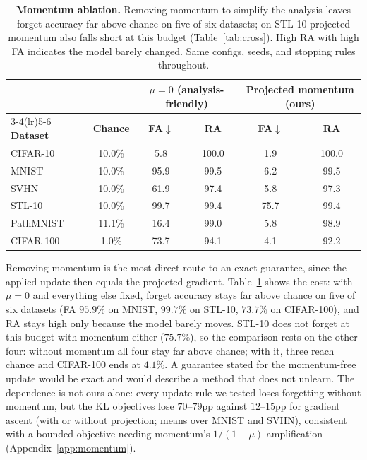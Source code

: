 \documentclass{article}
\newcommand{\rev}[1]{{\color{revisedB}#1}}
\theoremstyle{remark}
\theoremstyle{plain}
\begin{document}
\begin{table}[t]
\centering
\caption{\textbf{Momentum ablation.} Removing momentum to simplify the analysis
\rev{leaves forget accuracy far above chance on five of six datasets; on STL-10
projected momentum also falls short at this budget (Table~\ref{tab:cross})}.
High RA with high FA indicates the model barely changed. Same configs, seeds,
and stopping rules throughout.}
\label{tab:momentum}
\begin{tabular}{@{}lccccc@{}}
\toprule
& & \multicolumn{2}{c}{$\mu=0$ (analysis-friendly)} & \multicolumn{2}{c}{Projected momentum (ours)} \\
\cmidrule(lr){3-4}\cmidrule(lr){5-6}
\textbf{Dataset} & \textbf{Chance} & \textbf{FA}$\downarrow$ & \textbf{RA} & \textbf{FA}$\downarrow$ & \textbf{RA} \\
\midrule
CIFAR-10  & 10.0\% & \phantom{0}5.8 & 100.0 & \phantom{0}1.9 & 100.0 \\
MNIST     & 10.0\% & 95.9 & \phantom{0}99.5 & \phantom{0}6.2 & 99.5 \\
SVHN      & 10.0\% & 61.9 & \phantom{0}97.4 & \phantom{0}5.8 & 97.3 \\
STL-10    & 10.0\% & 99.7 & \phantom{0}99.4 & 75.7 & 99.4 \\
PathMNIST & 11.1\% & 16.4 & \phantom{0}99.0 & \phantom{0}5.8 & 98.9 \\
CIFAR-100 & \phantom{0}1.0\% & 73.7 & \phantom{0}94.1 & \phantom{0}4.1 & 92.2 \\
\bottomrule
\end{tabular}
\end{table}

Removing momentum is the most direct route to an exact guarantee, since the
applied update then equals the projected gradient. Table~\ref{tab:momentum} shows
the cost: with $\mu = 0$ and everything else fixed, \rev{forget accuracy stays
far above chance on five of six datasets} (FA $95.9\%$ on MNIST, $99.7\%$ on
STL-10, $73.7\%$ on CIFAR-100), and RA stays high only because the model barely
moves. \rev{STL-10 does not forget at this budget with momentum either
($75.7\%$), so the comparison rests on the other four: without momentum all four
stay far above chance; with it, three reach chance and CIFAR-100 ends at
$4.1\%$.} A guarantee stated for the momentum-free update would be exact and
would describe a method that does not unlearn. The dependence is not ours alone:
every update rule we tested loses forgetting without momentum, but the KL
objectives lose $70$--$79$pp against $12$--$15$pp for gradient ascent \rev{(with
or without projection; means over MNIST and SVHN), consistent with a bounded
objective needing} momentum's $1/(1-\mu)$ amplification
(Appendix~\ref{app:momentum}).
\end{document}
